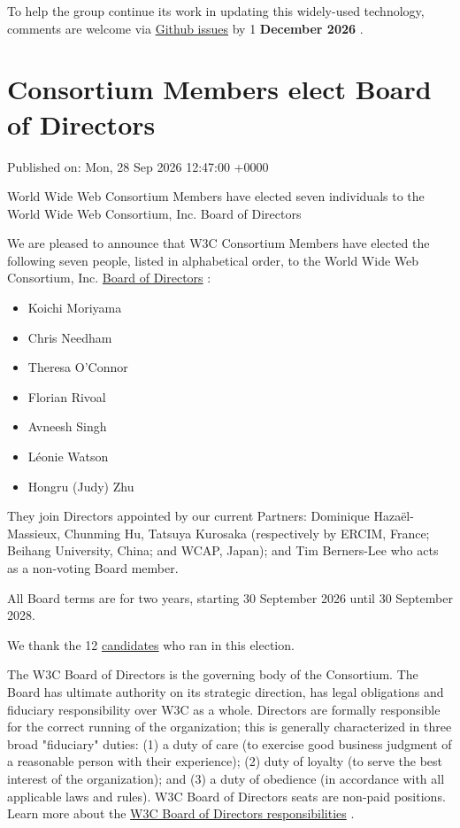 \documentclass[11pt,a4paper]{article}
\begin{document}
To help the group continue its work in updating this widely-used technology, comments are welcome via \href{https://github.com/w3c/svgwg/issues/}{Github issues} by 1 \textbf{December 2026} .

\section{Consortium Members elect Board of Directors}

Published on: Mon, 28 Sep 2026 12:47:00 +0000

World Wide Web Consortium Members have elected seven individuals to the World Wide Web Consortium, Inc. Board of Directors

We are pleased to announce that W3C Consortium Members have elected the following seven people, listed in alphabetical order, to the World Wide Web Consortium, Inc. \href{https://www.w3.org/groups/other/board/}{Board of Directors} :

\begin{itemize}
\item Koichi Moriyama
\item Chris Needham
\item Theresa O'Connor
\item Florian Rivoal
\item Avneesh Singh
\item Léonie Watson
\item Hongru (Judy) Zhu
\end{itemize}

They join Directors appointed by our current Partners: Dominique Hazaël-Massieux, Chunming Hu, Tatsuya Kurosaka (respectively by ERCIM, France; Beihang University, China; and WCAP, Japan); and Tim Berners-Lee who acts as a non-voting Board member.

All Board terms are for two years, starting 30 September 2026 until 30 September 2028.

We thank the 12 \href{https://www.w3.org/2026/08/bod-nominations.html}{candidates} who ran in this election.

The W3C Board of Directors is the governing body of the Consortium. The Board has ultimate authority on its strategic direction, has legal obligations and fiduciary responsibility over W3C as a whole. Directors are formally responsible for the correct running of the organization; this is generally characterized in three broad "fiduciary" duties: (1) a duty of care (to exercise good business judgment of a reasonable person with their experience); (2) duty of loyalty (to serve the best interest of the organization); and (3) a duty of obedience (in accordance with all applicable laws and rules). W3C Board of Directors seats are non-paid positions. Learn more about the \href{https://www.w3.org/2024/06/w3c-board-of-directors-skills-description.html}{W3C Board of Directors responsibilities} .
\end{document}
